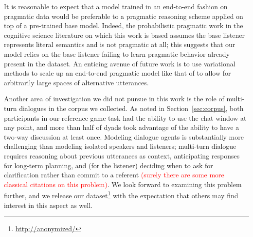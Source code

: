 \documentclass[11pt,letterpaper]{article}
\renewcommand{\|}{\mid}
\newcommand{\secref}[1]{Section~\ref{#1}}
\newcommand{\todocheck}[1]{\textcolor{red}{#1}}
\begin{document}
It is reasonable to expect that a model trained in an end-to-end fashion on
pragmatic data would be preferable to a pragmatic reasoning scheme applied on
top of a pre-trained base model.
Indeed, the probabilistic pragmatic work in the cognitive science literature
on which this work is based assumes the base listener represents literal semantics
and is not pragmatic at all; this suggests that our model relies on the base
listener failing to learn pragmatic behavior already present in the dataset.
An enticing avenue of future work is to use variational methods to scale
up an end-to-end pragmatic model like that of  to
allow for arbitrarily large spaces of alternative utterances.

Another area of investigation we did not pursue in this work is the role of
multi-turn dialogues in the corpus we collected. As noted in \secref{sec:corpus},
both participants in our reference game task had the ability to use the chat window
at any point, and more than half of dyads took advantage of the ability
to have a two-way discussion at least once. Modeling dialogue agents is substantially
more challenging than modeling isolated speakers and listeners; multi-turn dialogue
requires reasoning about previous utterances as context, anticipating
responses for long-term planning, and (for the listener) deciding when
to ask for clarification rather than commit to a referent
\cite{Clark:Wilkes-Gibbs:1986,Clark96}
\todocheck{(surely there are some more classical citations on this problem)}.
We look forward to examining this problem further, and we release our
dataset\footnote{\url{http://anonymized/}}
with the expectation that others may find interest in this aspect as well.
\end{document}

